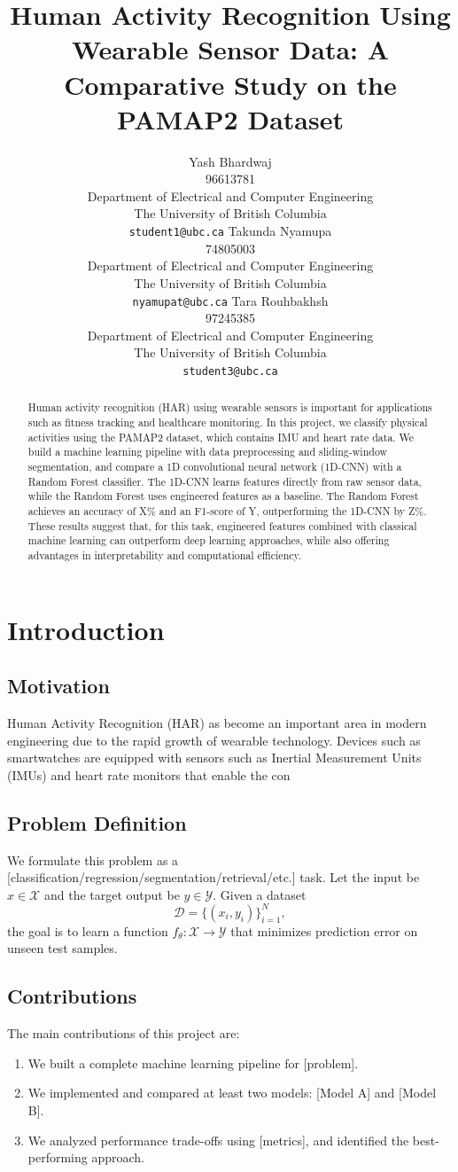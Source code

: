 \documentclass{article}
\title{Human Activity Recognition Using Wearable Sensor Data: A Comparative Study on the PAMAP2 Dataset}
\author{%
  Yash Bhardwaj \\
  96613781 \\
  Department of Electrical and Computer Engineering\\
  The University of British Columbia\\
  \texttt{student1@ubc.ca}
  \And
  Takunda Nyamupa \\
  74805003 \\
  Department of Electrical and Computer Engineering\\
  The University of British Columbia\\
  \texttt{nyamupat@ubc.ca}
  \And
  Tara Rouhbakhsh \\
  97245385 \\
  Department of Electrical and Computer Engineering\\
  The University of British Columbia\\
  \texttt{student3@ubc.ca}
}
\begin{document}
\maketitle

\begin{abstract}
Human activity recognition (HAR) using wearable sensors is important for applications such as fitness tracking and healthcare monitoring. In this project, we classify physical activities using the PAMAP2 dataset, which contains IMU and heart rate data. We build a machine learning pipeline with data preprocessing and sliding-window segmentation, and compare a 1D convolutional neural network (1D-CNN) with a Random Forest classifier. The 1D-CNN learns features directly from raw sensor data, while the Random Forest uses engineered features as a baseline. The Random Forest achieves an accuracy of X\% and an F1-score of Y, outperforming the 1D-CNN by Z\%. These results suggest that, for this task, engineered features combined with classical machine learning can outperform deep learning approaches, while also offering advantages in interpretability and computational efficiency.
\end{abstract}

\section{Introduction}

\subsection{Motivation}
Human Activity Recognition (HAR) as become an important area in modern engineering due to the rapid growth of wearable technology. Devices such as smartwatches are equipped with sensors such as Inertial Measurement Units (IMUs) and heart rate monitors that enable the con

\subsection{Problem Definition}
We formulate this problem as a [classification/regression/segmentation/retrieval/etc.] task. Let the input be $x \in \mathcal{X}$ and the target output be $y \in \mathcal{Y}$. Given a dataset
\[
\mathcal{D} = \{(x_i, y_i)\}_{i=1}^{N},
\]
the goal is to learn a function $f_\theta: \mathcal{X} \rightarrow \mathcal{Y}$ that minimizes prediction error on unseen test samples.

\subsection{Contributions}
The main contributions of this project are:
\begin{enumerate}[leftmargin=18pt]
    \item We built a complete machine learning pipeline for [problem].
    \item We implemented and compared at least two models: [Model A] and [Model B].
    \item We analyzed performance trade-offs using [metrics], and identified the best-performing approach.
\end{enumerate}
\end{document}
